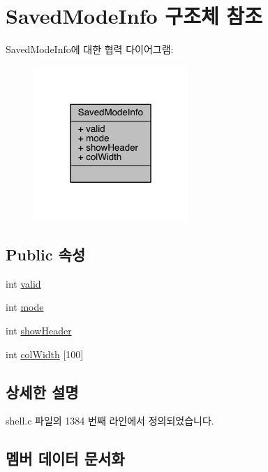 \hypertarget{struct_saved_mode_info}{}\section{Saved\+Mode\+Info 구조체 참조}
\label{struct_saved_mode_info}


Saved\+Mode\+Info에 대한 협력 다이어그램\+:
\nopagebreak
\begin{figure}[H]
\begin{center}
\leavevmode
\includegraphics[width=166pt]{struct_saved_mode_info__coll__graph}
\end{center}
\end{figure}
\subsection*{Public 속성}
\begin{DoxyCompactItemize}
\item 
int \hyperlink{struct_saved_mode_info_a43e863fb285c2aad913087572ebd5e27}{valid}
\item 
int \hyperlink{struct_saved_mode_info_ab6d30b28565d51ca017904f70b5edac6}{mode}
\item 
int \hyperlink{struct_saved_mode_info_a73fa5b451f94fa75fb5e27887831b8f4}{show\+Header}
\item 
int \hyperlink{struct_saved_mode_info_add96e86a9293b5e1bfd3ab92bf1a365f}{col\+Width} \mbox{[}100\mbox{]}
\end{DoxyCompactItemize}


\subsection{상세한 설명}


shell.\+c 파일의 1384 번째 라인에서 정의되었습니다.



\subsection{멤버 데이터 문서화}
\mbox{\label{struct_saved_mode_info_add96e86a9293b5e1bfd3ab92bf1a365f}} 
